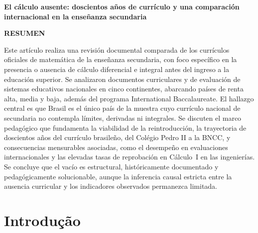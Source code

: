 \documentclass[12pt,a4paper,oneside]{article}
\begin{document}
\smallskip
{}

\medskip

\begin{center}
{\bfseries El cálculo ausente: doscientos años de currículo y una
comparación internacional en la enseñanza secundaria}
\end{center}
\vspace{2pt}

\noindent\textbf{RESUMEN}\\[2pt]
{\small\noindent
Este artículo realiza una revisión documental comparada de los
currículos oficiales de matemática de la enseñanza secundaria, con foco
específico en la presencia o ausencia de cálculo diferencial e integral
antes del ingreso a la educación superior. Se analizaron documentos
curriculares y de evaluación de sistemas educativos nacionales en cinco
continentes, abarcando países de renta alta, media y baja, además del
programa International Baccalaureate. El hallazgo central es que Brasil
es el único país de la muestra cuyo currículo nacional de secundaria no
contempla límites, derivadas ni integrales. Se discuten el marco
pedagógico que fundamenta la viabilidad de la reintroducción, la
trayectoria de doscientos años del currículo
brasileño, del Colégio Pedro II a la BNCC, y consecuencias mensurables
asociadas, como el desempeño en evaluaciones internacionales y las
elevadas tasas de reprobación en Cálculo~I en las ingenierías. Se
concluye que el vacío es estructural, históricamente documentado y
pedagógicamente solucionable, aunque la inferencia causal estricta
entre la ausencia curricular y los indicadores observados permanezca
limitada.\par}

\smallskip
{}

\bigskip

\section{Introdução}
\end{document}
